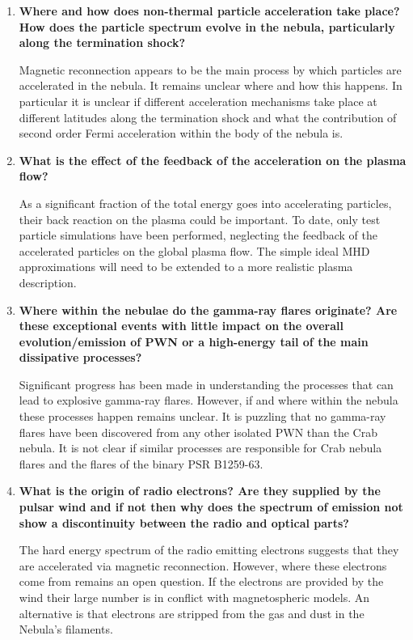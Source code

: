 \begin{enumerate}

\item \textbf{Where and how does non-thermal particle acceleration take place? How does the particle spectrum evolve in the nebula, particularly along the termination shock? }

Magnetic reconnection appears to be the main process by which particles are accelerated in the nebula. It remains unclear where and how this happens. In particular it is unclear if different acceleration mechanisms take place at different latitudes along the termination shock and what the contribution of second order Fermi acceleration within the body of the nebula is.

\item \textbf{What is the effect of the feedback of the acceleration on the plasma flow?}

As a significant fraction of the total energy goes into accelerating particles, their back reaction on the plasma could be important. To date, only test particle simulations have been performed, neglecting the feedback of the accelerated particles on the global plasma flow. The simple ideal MHD approximations will need to be extended to a more realistic plasma description.

\item \textbf{Where within the nebulae do the gamma-ray flares originate? Are these exceptional events with little impact on the overall evolution/emission of PWN or a high-energy tail of the main dissipative processes?  }

Significant progress has been made in understanding the processes that can lead to explosive gamma-ray flares. However, if and where within the nebula these processes happen remains unclear. It is puzzling that no gamma-ray flares have been discovered from any other isolated PWN than the Crab nebula. It is not clear if similar processes are responsible for Crab nebula flares and the flares of the binary PSR B1259-63.

\item \textbf{What is the origin of radio electrons? Are they supplied by the pulsar wind and if not then why does the spectrum of emission not show a discontinuity between the radio and optical parts? }

The hard energy spectrum of the radio emitting electrons suggests that they are accelerated via magnetic reconnection. However, where these electrons come from remains an open question. If the electrons are provided by the wind their large number is in conflict with magnetospheric models. An alternative is that electrons are stripped from the gas and dust in the Nebula's filaments.


\end{enumerate}
